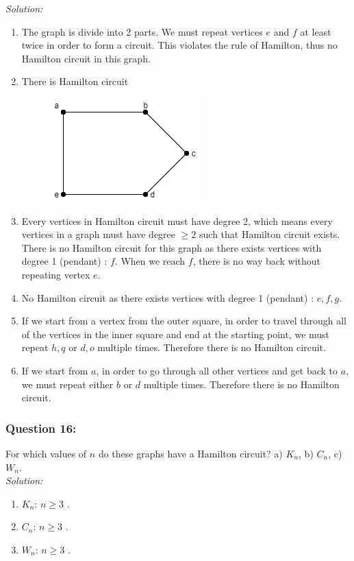 \documentclass[a4paper]{article}
\begin{document}
	\emph{Solution:}
	\begin{enumerate}[label = \alph*)]
		\item The graph is divide into 2 parts. We must repeat vertices $e$ and $f$ at least twice in order to form a circuit. This violates the rule of Hamilton, thus no Hamilton circuit in this graph.
		\item There is Hamilton circuit
		      \begin{figure}[H]
			      \centering
			      \includegraphics[width = 0.3 \textwidth]{tut915_7.png}
		      \end{figure}
		\item Every vertices in Hamilton circuit must have degree 2, which means every vertices in a graph must have degree $
			      \geq 2$ such that Hamilton circuit exists. There is no Hamilton circuit for this graph as there exists vertices with degree 1 (pendant) : $f$. When we reach $f$, there is no way back without repeating vertex $e$.
		\item No Hamilton circuit as there exists vertices with degree 1 (pendant) : $e,f,g$.
		\item If we start from a vertex from the outer square, in order to travel through all of the vertices in the inner square and end at the starting point, we must repeat $h,q$ or $d,o$ multiple times. Therefore there is no Hamilton circuit.
		\item If we start from $a$, in order to go through all other vertices and get back to $a$, we must repeat either $b$ or $d$ multiple times. Therefore there is no Hamilton circuit.
	\end{enumerate}
	\subsubsection*{Question 16:}
	For which values of $n$ do these graphs have a Hamilton circuit? a) $K_n$, b) $C_n$, c) $W_n$.\\
	\emph{Solution:}
	\begin{enumerate}[label = \alph*)]
		\item $K_n$: $n \geq 3$ .
		\item $C_n$: $n \geq 3$ .
		\item $W_n$: $n \geq 3$ .
	\end{enumerate}
\end{document}
